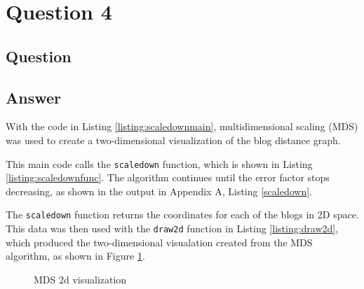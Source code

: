\section{Question 4}

\subsection{Question}


\subsection{Answer}

With the code in Listing \ref{listing:scaledownmain}, multidimensional scaling (MDS) was used to create a two-dimensional visualization of the blog distance graph.



This main code calls the {\tt scaledown} function, which is shown in Listing \ref{listing:scaledownfunc}. The algorithm continues until the error factor stops decreasing, as shown in the output in Appendix A, Listing \ref{scaledown}. 



The {\tt scaledown} function returns the coordinates for each of the blogs in 2D space. This data was then used with the {\tt draw2d} function in Listing \ref{listing:draw2d}, which produced the two-dimensional visualation created from the MDS algorithm, as shown in Figure \ref{fig:blogs2d}.



\begin{figure}[h!]
\centering
{}
\caption{MDS 2d visualization}
\label{fig:blogs2d}
\end{figure}